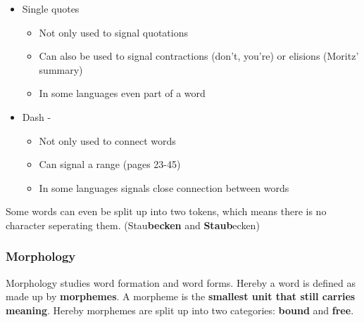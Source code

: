 \documentclass[
../../NLP4W_Summary.tex,
]
{subfiles}
\begin{document}
\begin{greenbox}
\begin{itemize}
        \item Single quotes
        \begin{itemize}
            \item Not only used to signal quotations
            \item Can also be used to signal contractions (don't, you're) or elisions (Moritz' summary)
            \item In some languages even part of a word
        \end{itemize}
        \item Dash -
        \begin{itemize}
            \item Not only used to connect words
            \item Can signal a range (pages 23-45)
            \item In some languages signals close connection between words
        \end{itemize}
    \end{itemize}
\end{greenbox}

Some words can even be split up into two tokens, which means there is no character seperating them. (Stau\textbf{becken} and \textbf{Staub}ecken)

\newpage
\subsubsection{Morphology}
Morphology studies word formation and word forms. Hereby a word is defined as made up by \textbf{morphemes}. A morpheme is the \textbf{smallest unit that still carries meaning}.
Hereby morphemes are split up into two categories: \textbf{bound} and \textbf{free}. 
\end{document}
